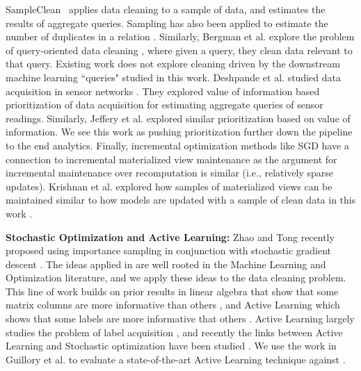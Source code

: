 SampleClean~\cite{wang1999sample} applies data cleaning to a sample of data, and estimates the results of aggregate queries.
Sampling has also been applied to estimate the number of duplicates in a relation \cite{heise2014estimating}. 
Similarly, Bergman et al. explore the problem of query-oriented data cleaning \cite{DBLP:conf/sigmod/BergmanMNT15}, where given a query, they clean data relevant to that query. 
Existing work does not explore cleaning driven by the downstream machine learning ``queries" studied in this work.
Deshpande et al. studied data acquisition in sensor networks \cite{deshpande2004model}. They explored value of information based prioritization of data acquisition for estimating aggregate queries of sensor readings.
Similarly, Jeffery et al. \cite{DBLP:conf/pervasive/JefferyAFHW06} explored similar prioritization based on value of information.
We see this work as pushing prioritization further down the pipeline to the end analytics.
Finally, incremental optimization methods like SGD have a connection to incremental materialized view maintenance as the argument for incremental maintenance over recomputation is similar (i.e., relatively sparse updates).
Krishnan et al. explored how samples of materialized views can be maintained similar to how models are updated with a sample of clean data in this work \cite{krishnan2015svc}.

\vspace{0.5em}

\noindent \textbf{Stochastic Optimization and Active Learning: } Zhao and Tong recently proposed using importance sampling in conjunction with stochastic gradient descent \cite{zhao2014stochastic}. 
The ideas applied in \sys are well rooted in the Machine Learning and Optimization literature, and we apply these ideas to the data cleaning problem. 
This line of work builds on prior results in linear algebra that show that some matrix columns are more informative than others \cite{drineas2012fast}, and Active Learning which shows that some labels are more informative that others \cite{settles2010active}.
Active Learning largely studies the problem of label acquisition \cite{settles2010active},
and recently the links between Active Learning and Stochastic optimization have been studied \cite{guillory2009active}. 
We use the work in Guillory et al. to evaluate a state-of-the-art Active Learning technique against \sys.


\vspace{0.5em}

